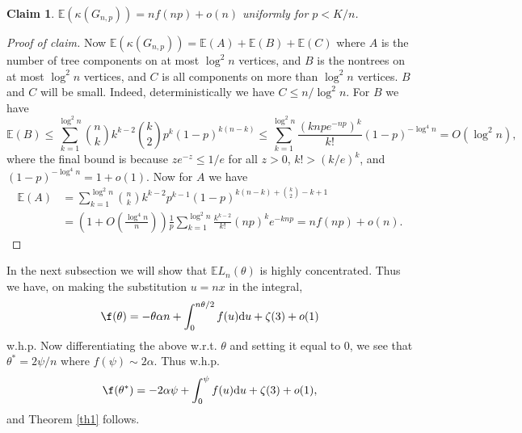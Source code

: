 \documentclass[12pt]{article}
\newcommand{\1}{\textbf{1}}
\def\a{\alpha} \def\b{\beta} \def\d{\delta} \def\D{\Delta}
\def\z{\zeta} \def\th{\theta} \def\TH{\Theta} \def\Th{\Theta}  \def\l{\lambda}
\newtheorem{claim}{Claim}
\newcommand{\brac}[1]{\left(#1\right)}
\def\dd{\text{d}}
\def\E{\mathbb{E}}
\begin{document}
\begin{claim} $\E (\kappa(G_{n, p})) = n f(np)+ o(n)$ uniformly for $p < K/n$.
\end{claim} 
\begin{proof}[Proof of claim] 
Now $\E (\kappa(G_{n, p})) = \E(A) + \E(B) + \E(C)$ where $A$ is the number of tree components on at most $\log^2 n$ vertices, and $B$ is the nontrees on at most $\log^2 n$ vertices, and $C$ is all components on more than $\log^2 n$ vertices. $B$ and $C$ will be small. Indeed, deterministically we have $C \le n/\log^2 n$. For $B$ we have
\begin{equation*}
    \E (B) \le  \sum_{k=1}^{\log^2 n} \binom nk k^{k-2}\binom k2  p^k (1-p)^{  k(n-k)} \le \sum_{k=1}^{\log^2 n} \frac{\brac{knpe^{-np}}^k}{k!}  (1-p)^{-\log^4 n} = O(\log^2 n),
\end{equation*}
where the final bound is because $ze^{-z} \le 1/e$ for all $z > 0$, $k! > (k/e)^k$, and $(1-p)^{-\log^4 n}=1+o(1)$.
Now for $A$ we have
\begin{align*}
    \E(A) &= \sum_{k=1}^{\log^2 n} \binom nk k^{k-2} p^{k-1} (1-p)^{k(n-k)+\binom k2 - k + 1}\\
    & = \brac{1 + O\brac{\frac{\log^4 n}{n}}} \frac{1}{p}\sum_{k=1}^{\log^2 n} \frac{k^{k-2} }{k!} (np)^{k} e^{-knp} = nf(np) + o(n). 
\end{align*}
\end{proof}
 In the next subsection we will show that $\E L_n(\th)$ is highly concentrated. Thus we have, on making the substitution $u=nx$ in the integral, 
\[
\f(\th) = - \th \a n+\int_0^{n\theta/2} f(u) \dd u +\z(3)  +o(1)
\]
w.h.p. 
Now differentiating the above w.r.t. $\th$ and setting it equal to 0, we see that $\th^*=2\psi/n$ where
$f(\psi) \sim 2\a.$ Thus w.h.p.
\[
\f(\th^*)=-2\a\psi+\int_0^{\psi} f(u) \dd u +\z(3)  +o(1),
\]
and Theorem \ref{th1} follows.
\end{document}
